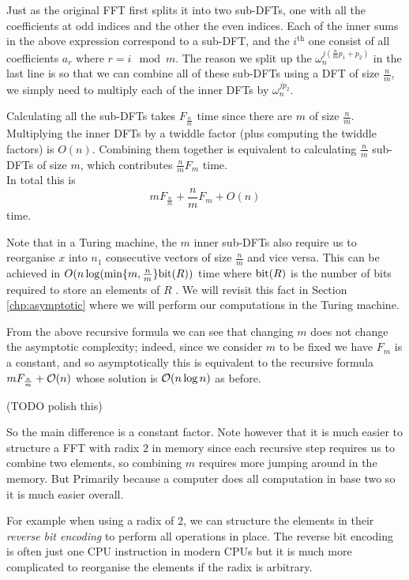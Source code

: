 Just as the original FFT first splits it into two sub-DFTs, one with all the coefficients at odd indices and the other the even indices. Each of the inner sums in the above expression correspond to a sub-DFT, and the $i^{\text{th}}$ one consist of all coefficients $a_r$ where $r = i \mod m$. The reason we split up the $\omega_n^{j(\frac{n}{m}p_1 + p_2)}$ in the last line is so that we can combine all of these sub-DFTs using a DFT of size $\frac{n}{m}$, we simply need to multiply each of the inner DFTs by $\omega_n^{jp_2}$.

Calculating all the sub-DFTs takes $F_{\frac{n}{m}}$ time since there are $m$ of size $\frac{n}{m}$. Multiplying the inner DFTs by a twiddle factor (plus computing the twiddle factors) is $O(n)$. Combining them together is equivalent to calculating $\frac{n}{m}$ sub-DFTs of size $m$, which contributes $\frac{n}{m}F_{m}$ time.\\
In total this is
\[
    mF_{\frac{n}{m}} + \frac{n}{m}F_m + O(n)
\]
time.

Note that in a Turing machine, the $m$ inner sub-DFTs also require us to reorganise $x$ into $n_1$ consecutive vectors of size $\frac{n}{m}$ and vice versa. This can be achieved in $O(n \log( \min \{m, \frac{n}{m}\}\textrm{bit}(R))$ time where $\textrm{bit}(R)$ is the number of bits required to store an elements of $R$ \cite{ffnlogn}. We will revisit this fact in Section \ref{chp:asymptotic} where we will perform our computations in the Turing machine.

From the above recursive formula we can see that changing $m$ does not change the asymptotic complexity; indeed, since we consider $m$ to be fixed we have $F_m$ is a constant, and so asymptotically this is equivalent to the recursive formula $mF_{\frac{n}{m}} + \mathcal O(n)$ whose solution is $\mathcal O(n \log n)$ as before. 

\medskip
(TODO polish this)
\medskip

So the main difference is a constant factor. Note however that it is much easier to structure a FFT with radix $2$ in memory since each recursive step requires us to combine two elements, so combining $m$ requires more jumping around in the memory. But Primarily because a computer does all computation in base two so it is much easier overall.

For example when using a radix of 2, we can structure the elements in their \emph{reverse bit encoding} to perform all operations in place. The reverse bit encoding is often just one CPU instruction in modern CPUs but it is much more complicated to reorganise the elements if the radix is arbitrary.

